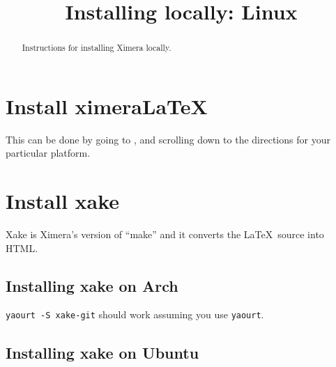 \documentclass{ximera}
\title{Installing locally: Linux}
\begin{document}
\begin{abstract}
Instructions for installing Ximera locally.
\end{abstract}
\maketitle



\section{Install ximeraLaTeX}

This can be done by going to , and scrolling
down to the directions for your particular platform.




\section{Install xake}

Xake is Ximera's version of ``make'' and it converts the
\LaTeX\ source into HTML.

\subsection{Installing xake on Arch}

\verb!yaourt -S xake-git! should work assuming you use \texttt{yaourt}.

  
\subsection{Installing xake on Ubuntu}
\end{document}
